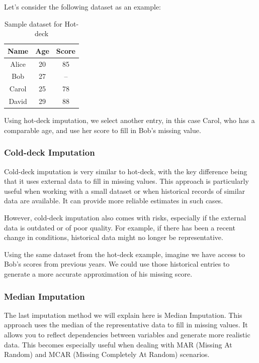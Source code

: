 \documentclass[a4paper,12pt]{article}
\begin{document}
Let’s consider the following dataset as an example:

\begin{table}[h]
\centering
\begin{tabular}{|c|c|c|}
\hline
\textbf{Name} & \textbf{Age} & \textbf{Score} \\
\hline
Alice & 20 & 85 \\
\hline
Bob & 27 & -- \\
\hline
Carol & 25 & 78 \\
\hline
David & 29 & 88 \\
\hline
\end{tabular}
\caption{Sample dataset for Hot-deck}
\label{tab:sample_data}
\end{table}

Using hot-deck imputation, we select another entry, in this case Carol, who has a comparable age, and use her score to fill in Bob’s missing value.

\subsubsection{Cold-deck Imputation}

Cold-deck imputation is very similar to hot-deck, with the key difference being that it uses external data to fill in missing values. This approach is particularly useful when working with a small dataset or when historical records of similar data are available. It can provide more reliable estimates in such cases. 

However, cold-deck imputation also comes with risks, especially if the external data is outdated or of poor quality. For example, if there has been a recent change in conditions, historical data might no longer be representative. 

Using the same dataset from the hot-deck example, imagine we have access to Bob’s scores from previous years. We could use those historical entries to generate a more accurate approximation of his missing score.

\subsubsection{Median Imputation}

The last imputation method we will explain here is Median Imputation. This approach uses the median of the representative data to fill in missing values. It allows you to reflect dependencies between variables and generate more realistic data. This becomes especially useful when dealing with MAR (Missing At Random) and MCAR (Missing Completely At Random) scenarios.\\
\end{document}
